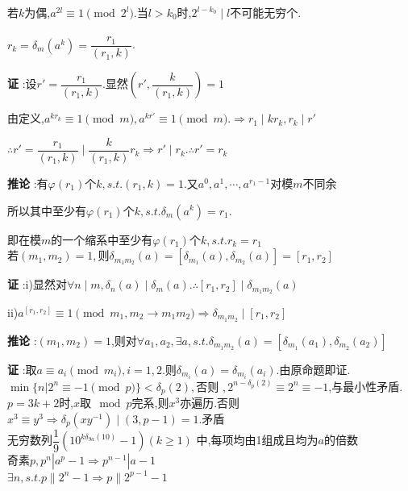 若$ k$为偶,$ a^{2l}\equiv 1 \pmod{2^l}.$当$ l>k_0$时,$ 2^{l-k_0}\mid l$不可能无穷个.
\\
\\
$ r_k=\delta_m(a^k)=\dfrac{r_1}{(r_1,k)}$.

{\bf 证 }:设$ r'=\dfrac{r_1}{(r_1,k)}$.显然$ (r',\dfrac{k}{(r_1,k)})=1$

由定义,$ a^{kr_k}\equiv 1 \pmod m, a^{kr'}\equiv 1 \pmod m. \Rightarrow  r_1 \mid kr_k,r_k\mid r'$

$ \therefore r' =\dfrac{r_1}{(r_1,k)}\mid \dfrac{k}{(r_1,k)}r_k\Rightarrow r' \mid r_k. \therefore r'=r_k$

{\bf 推论 }:有$ \varphi(r_1)$个$ k,s.t.(r_1,k)=1.$又$ a^0,a^1,\cdots,a^{r_1-1}$对模$ m$不同余

所以其中至少有$ \varphi(r_1)$个$ k,s.t.\delta_m(a^k)=r_1$.

即在模$ m$的一个缩系中至少有$ \varphi(r_1)$个$ k,s.t.r_k=r_1$
\\

若$ (m_1,m_2)=1,$则$ \delta_{m_1m_2}(a)=[\delta_{m_1}(a),\delta_{m_2}(a)]=[r_1,r_2]$

{\bf 证 }:i)显然对$ \forall n \mid m,\delta_n(a)\mid \delta_m(a). \therefore [r_1,r_2] \mid \delta_{m_1m_2}(a)$ 

ii)$ a^{[r_1,r_2]}\equiv 1 \pmod{m_1,m_2 \rightarrow m_1m_2}\Rightarrow \delta_{m_1m_2}\mid [r_1,r_2]$

{\bf 推论 }:$ (m_1,m_2)=1$,则对$ \forall a_1,a_2,\exists a,s.t.\delta_{m_1m_2}(a)=[\delta_{m_1}(a_1),\delta_{m_2}(a_2)]$

{\bf 证 }:取$ a\equiv a_i \pmod{m_i},i=1,2$.则$ \delta_{m_i}(a)=\delta_{m_i}(a_i)$.由原命题即证.
\\

$ \min\{ n|2^n\equiv -1 \pmod p\}<\delta_p(2),$否则 $,2^{n-\delta_p(2)}\equiv 2^n \equiv -1$,与最小性矛盾.
\\

$ p=3k+2$时,$ x$取$ \mod p$完系,则$ x^3$亦遍历.否则$ x^3\equiv y^3\Rightarrow \delta_p(xy^{-1})\mid(3,p-1)=1$.矛盾
\\

无穷数列$  \dfrac{1}{9}(10^{k\delta_{9a}(10)}-1)(k\ge1) $ 中,每项均由1组成且均为$ a$的倍数
\\

奇素$ p,p^n|a^p-1\Rightarrow p^{n-1}|a-1$
\\

$ \exists n,s.t.p\parallel2^n-1\Rightarrow p\parallel 2^{p-1}-1$

